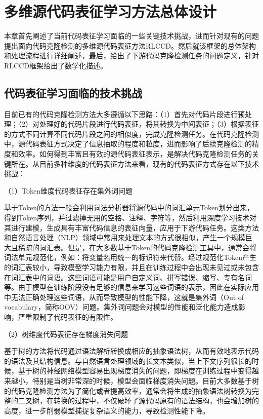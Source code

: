 \chapter{多维源代码表征学习方法总体设计}
\label{chap:design}

本章首先阐述了当前代码表征学习面临的一些关键技术挑战，进而针对现有的问题提出面向代码克隆检测的多维源代码表征方法RLCCD。然后就该框架的总体架构和处理流程进行详细阐述，最后，给出了下游代码克隆检测任务的问题定义，针对RLCCD框架给出了数学化描述。

\section{代码表征学习面临的技术挑战}
\label{sec:challenges}
目前已有的代码克隆检测方法大多遵循以下思路：（1）首先对代码片段进行预处理；（2）对处理好的代码片段进行代码表征，将其转换为中间表征；（3）根据表征的方式不同计算不同代码片段之间的相似度，完成克隆检测任务。在代码克隆检测中，源代码表征方式决定了信息抽取的程度和粒度，进而影响了后续克隆检测的精度和效率。如何得到丰富且有效的源代码表征表示，是解决代码克隆检测任务的关键所在。从目前多种维度的代码表征方法来看，现有的代码表征方式存在以下技术挑战：

（1）Token维度代码表征存在集外词问题

基于Token的方法一般会利用词法分析器将源代码中的词汇单元Token划分出来，得到Token序列，并过滤掉无用的空格、注释、字符等，然后利用深度学习技术对其进行建模，生成具有丰富代码信息的表征向量，应用于下游代码任务。这类方法和自然语言处理（NLP）领域中常用来处理文本的方式很相似，产生一个规模巨大且稀疏的词汇表。但是，在大多数基于Token的代码克隆检测工具中，通常会将词法单元规范化，例如：将变量名用统一的标识符来代替。经过规范化Token产生的词汇表较小，导致模型学习能力有限，并且在训练过程中会出现未见过或未包含在词汇表中的词语。这些词语可能是用户自定义词、拼写错误、缩写、专有名词等。由于模型在训练阶段没有足够的信息来学习这些词语的表示，因此在实际应用中无法正确处理这些词语，从而导致模型的性能下降，这就是集外词（Out of vocabulary，简称OOV）问题。集外词问题会对模型的性能和泛化能力造成影响，严重限制了代码表征的有限性。

（2）树维度代码表征存在梯度消失问题

基于树的方法将代码通过语法解析转换成相应的抽象语法树，从而有效地表示代码的语法及其结构信息。与自然语言处理领域的长文本类似，当上下文序列很长的时候，基于树的神经网络模型容易出现梯度消失的问题，即梯度在训练过程中变得越来越小，特别是当树非常深的时候，模型会面临梯度消失问题。目前大多数基于树的代码克隆检测方法为了简化或者提高效率，通常会将生成的抽象语法树转换为完整的二叉树，在转换的过程中，不仅破坏了源代码原有的语法结构，也会增加树的高度，进一步削弱模型捕捉复杂语义的能力，导致检测性能下降。

